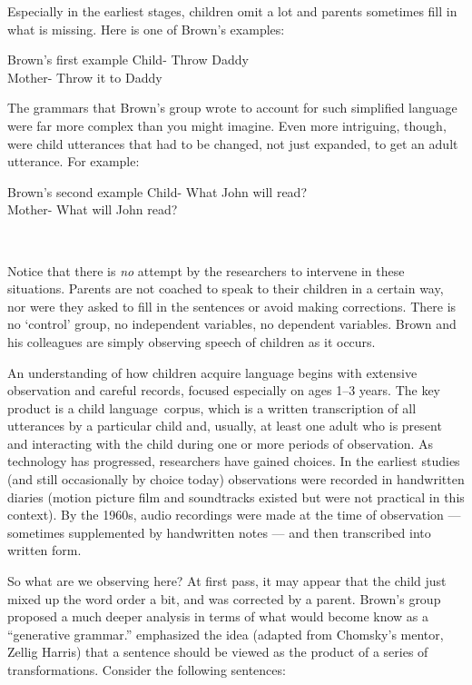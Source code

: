 \begin{refsection}
Especially in the earliest stages, children omit a lot and parents sometimes fill in what is missing. Here is one of Brown’s examples:

\begin{apatextbox}{Brown’s first example}
Child- Throw Daddy \\
Mother- Throw it to Daddy
\end{apatextbox}

The grammars that Brown’s group wrote to account for such simplified language were far more complex than you might imagine. Even more intriguing, though, were child utterances that had to be changed, not just expanded, to get an adult utterance. For example:

\begin{apatextbox}{Brown’s second example}
Child- What John will read? \\
Mother- What will John read? 
\end{apatextbox}~\citep{Brown:1968df}

Notice that there is \emph{no} attempt by the researchers to intervene in these situations. Parents are not coached to speak to their children in a certain way, nor were they asked to fill in the sentences or avoid making corrections. There is no ‘control’ group, no independent variables, no dependent variables. Brown and his colleagues are simply observing speech of children as it occurs.

An understanding of how children acquire language begins with extensive observation and careful records, focused especially on ages 1--3 years. The key product is a child language corpus, which is a written transcription of all utterances by a particular child and, usually, at least one adult who is present and interacting with the child during one or more periods of observation. As technology has progressed, researchers have gained choices. In the earliest studies (and still occasionally by choice today) observations were recorded in handwritten diaries (motion picture film and soundtracks existed but were not practical in this context). By the 1960s, audio recordings were made at the time of observation — sometimes supplemented by handwritten notes — and then transcribed into written form. 

So what are we observing here? At first pass, it may appear that the child just mixed up the word order a bit, and was corrected by a parent. Brown’s group proposed a much deeper analysis in terms of what would become know as a “generative grammar.”
 emphasized the idea (adapted from Chomsky’s mentor, Zellig Harris) that a sentence should be viewed as the product of a series of transformations. Consider the following sentences:


\end{refsection}
